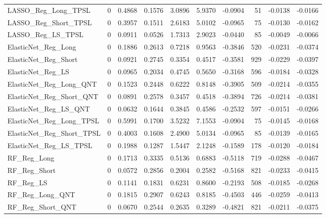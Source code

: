 \begin{tabular}{llrrrrrrrr}
\cline{1-10}
LASSO\_Reg\_Long\_TPSL & 0 & 0.4868 & 0.1576 & 3.0896 & 5.9370 & -0.0904 & 51 & -0.0138 & -0.0166 \\
\cline{1-10}
LASSO\_Reg\_Short\_TPSL & 0 & 0.3957 & 0.1511 & 2.6183 & 5.0102 & -0.0965 & 75 & -0.0130 & -0.0162 \\
\cline{1-10}
LASSO\_Reg\_LS\_TPSL & 0 & 0.0911 & 0.0526 & 1.7313 & 2.9023 & -0.0440 & 85 & -0.0049 & -0.0066 \\
\cline{1-10}
ElasticNet\_Reg\_Long & 0 & 0.1886 & 0.2613 & 0.7218 & 0.9563 & -0.3846 & 520 & -0.0231 & -0.0374 \\
\cline{1-10}
ElasticNet\_Reg\_Short & 0 & 0.0921 & 0.2745 & 0.3354 & 0.4517 & -0.3581 & 929 & -0.0229 & -0.0397 \\
\cline{1-10}
ElasticNet\_Reg\_LS & 0 & 0.0965 & 0.2034 & 0.4745 & 0.5650 & -0.3168 & 596 & -0.0184 & -0.0328 \\
\cline{1-10}
ElasticNet\_Reg\_Long\_QNT & 0 & 0.1523 & 0.2448 & 0.6222 & 0.8148 & -0.3905 & 509 & -0.0214 & -0.0355 \\
\cline{1-10}
ElasticNet\_Reg\_Short\_QNT & 0 & 0.0891 & 0.2578 & 0.3457 & 0.4518 & -0.3894 & 726 & -0.0214 & -0.0381 \\
\cline{1-10}
ElasticNet\_Reg\_LS\_QNT & 0 & 0.0632 & 0.1644 & 0.3845 & 0.4586 & -0.2532 & 597 & -0.0151 & -0.0266 \\
\cline{1-10}
ElasticNet\_Reg\_Long\_TPSL & 0 & 0.5991 & 0.1700 & 3.5232 & 7.1553 & -0.0904 & 75 & -0.0145 & -0.0168 \\
\cline{1-10}
ElasticNet\_Reg\_Short\_TPSL & 0 & 0.4003 & 0.1608 & 2.4900 & 5.0134 & -0.0965 & 85 & -0.0139 & -0.0165 \\
\cline{1-10}
ElasticNet\_Reg\_LS\_TPSL & 0 & 0.1988 & 0.1287 & 1.5447 & 2.1248 & -0.1589 & 178 & -0.0120 & -0.0184 \\
\cline{1-10}
RF\_Reg\_Long & 0 & 0.1713 & 0.3335 & 0.5136 & 0.6883 & -0.5118 & 719 & -0.0288 & -0.0467 \\
\cline{1-10}
RF\_Reg\_Short & 0 & 0.0572 & 0.2856 & 0.2004 & 0.2582 & -0.5168 & 821 & -0.0233 & -0.0415 \\
\cline{1-10}
RF\_Reg\_LS & 0 & 0.1141 & 0.1831 & 0.6231 & 0.8600 & -0.2193 & 508 & -0.0185 & -0.0268 \\
\cline{1-10}
RF\_Reg\_Long\_QNT & 0 & 0.1815 & 0.2907 & 0.6243 & 0.8185 & -0.4503 & 446 & -0.0259 & -0.0413 \\
\cline{1-10}
RF\_Reg\_Short\_QNT & 0 & 0.0670 & 0.2544 & 0.2635 & 0.3289 & -0.4821 & 821 & -0.0211 & -0.0375 \\

\end{tabular}
